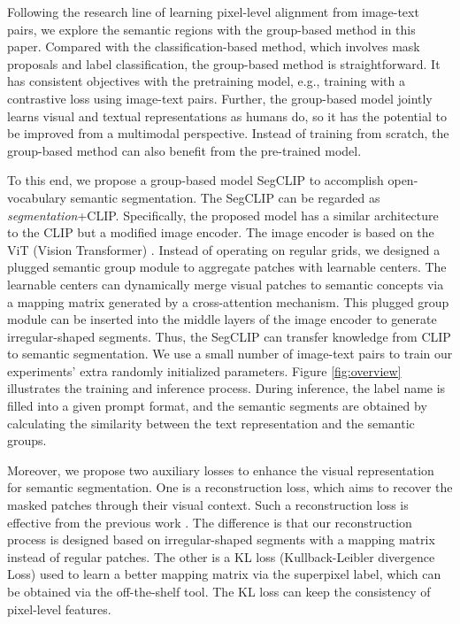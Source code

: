 \documentclass{article}
\theoremstyle{plain}
\theoremstyle{definition}
\theoremstyle{remark}
\begin{document}
Following the research line of learning pixel-level alignment from image-text pairs, we explore the semantic regions with the group-based method in this paper. Compared with the classification-based method, which involves mask proposals and label classification, the group-based method is straightforward. It has consistent objectives with the pretraining model, e.g., training with a contrastive loss using image-text pairs. Further, the group-based model jointly learns visual and textual representations as humans do, so it has the potential to be improved from a multimodal perspective. Instead of training from scratch, the group-based method can also benefit from the pre-trained model.

To this end, we propose a group-based model SegCLIP to accomplish open-vocabulary semantic segmentation. The SegCLIP can be regarded as \textit{segmentation}+CLIP. Specifically, the proposed model has a similar architecture to the CLIP but a modified image encoder. The image encoder is based on the ViT (Vision Transformer) \cite{Dosovitskiy2021An}. Instead of operating on regular grids, we designed a plugged semantic group module to aggregate patches with learnable centers. The learnable centers can dynamically merge visual patches to semantic concepts via a mapping matrix generated by a cross-attention mechanism. This plugged group module can be inserted into the middle layers of the image encoder to generate irregular-shaped segments. Thus, the SegCLIP can transfer knowledge from CLIP to semantic segmentation. We use a small number of image-text pairs to train our experiments' extra randomly initialized parameters. Figure \ref{fig:overview} illustrates the training and inference process. During inference, the label name is filled into a given prompt format, and the semantic segments are obtained by calculating the similarity between the text representation and the semantic groups.

Moreover, we propose two auxiliary losses to enhance the visual representation for semantic segmentation. One is a reconstruction loss, which aims to recover the masked patches through their visual context. Such a reconstruction loss is effective from the previous work \cite{He2022Masked,wang2022bevt,Zhou2022iBOT}. The difference is that our reconstruction process is designed based on irregular-shaped segments with a mapping matrix instead of regular patches. The other is a KL loss (Kullback-Leibler divergence Loss) used to learn a better mapping matrix via the superpixel label, which can be obtained via the off-the-shelf tool. The KL loss can keep the consistency of pixel-level features.
\end{document}

